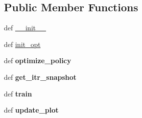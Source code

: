 \subsection*{Public Member Functions}
\begin{DoxyCompactItemize}
\item 
def \hyperlink{classaml__opt_1_1policy__opt_1_1reps_1_1_r_e_p_s_a08147c6602721fc1d480741b746c1b61}{\-\_\-\-\_\-init\-\_\-\-\_\-}
\item 
def \hyperlink{classaml__opt_1_1policy__opt_1_1reps_1_1_r_e_p_s_ab675a32e5e6c0549285d28fa92bb4b7b}{init\-\_\-opt}
\item 
\hypertarget{classaml__opt_1_1policy__opt_1_1reps_1_1_r_e_p_s_ae9a1d2f2c98429fa9de625731d605aab}{def {\bfseries optimize\-\_\-policy}}\label{classaml__opt_1_1policy__opt_1_1reps_1_1_r_e_p_s_ae9a1d2f2c98429fa9de625731d605aab}

\item 
\hypertarget{classaml__opt_1_1policy__opt_1_1reps_1_1_r_e_p_s_a5515f020a41c284cb097f3582aaf5290}{def {\bfseries get\-\_\-itr\-\_\-snapshot}}\label{classaml__opt_1_1policy__opt_1_1reps_1_1_r_e_p_s_a5515f020a41c284cb097f3582aaf5290}

\item 
\hypertarget{classaml__opt_1_1policy__opt_1_1reps_1_1_r_e_p_s_aa41dcd0fdd7bfd0cc0dde09fbdc3e450}{def {\bfseries train}}\label{classaml__opt_1_1policy__opt_1_1reps_1_1_r_e_p_s_aa41dcd0fdd7bfd0cc0dde09fbdc3e450}

\item 
\hypertarget{classaml__opt_1_1policy__opt_1_1reps_1_1_r_e_p_s_a14d29a892e1f573596cbb0947dc9c0cf}{def {\bfseries update\-\_\-plot}}\label{classaml__opt_1_1policy__opt_1_1reps_1_1_r_e_p_s_a14d29a892e1f573596cbb0947dc9c0cf}

\end{DoxyCompactItemize}


